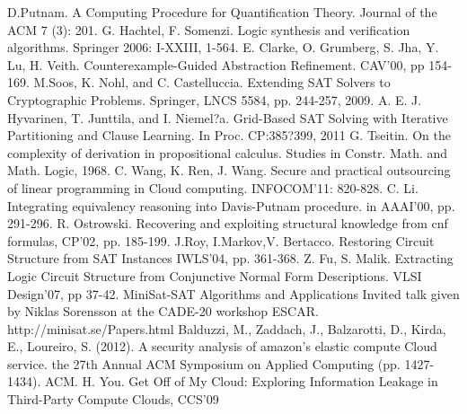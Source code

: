 \documentclass[conference]{IEEEtran}
\begin{document}
%
%
%
\begin{thebibliography}{26}

D.Putnam.
A Computing Procedure for Quantification Theory.
Journal of the ACM 7 (3): 201.
G. Hachtel, F. Somenzi.
Logic synthesis and verification algorithms. Springer 2006: I-XXIII, 1-564.
E. Clarke, O. Grumberg, S. Jha, Y. Lu, H. Veith.
Counterexample-Guided Abstraction Refinement.
CAV'00, pp 154-169.
M.Soos, K. Nohl, and C. Castelluccia. Extending SAT Solvers to Cryptographic Problems.
 Springer, LNCS 5584, pp. 244-257, 2009.
A. E. J. Hyvarinen, T. Junttila, and I. Niemel?a.
Grid-Based SAT Solving with Iterative Partitioning and Clause Learning. In Proc. CP:385?399, 2011
G. Tseitin.
On the complexity of derivation in propositional calculus. Studies in Constr. Math. and Math. Logic, 1968.
C. Wang, K. Ren, J. Wang.
Secure and practical outsourcing of linear programming in Cloud computing. INFOCOM'11: 820-828.
C. Li.
Integrating equivalency reasoning into Davis-Putnam procedure. in AAAI'00, pp. 291-296.
R. Ostrowski.
Recovering and exploiting structural knowledge from cnf formulas, CP'02, pp. 185-199.
J.Roy, I.Markov,V. Bertacco.
Restoring Circuit Structure from SAT Instances IWLS'04, pp. 361-368.
Z. Fu, S. Malik.
Extracting Logic Circuit Structure from Conjunctive Normal Form Descriptions.
VLSI Design'07, pp 37-42.
MiniSat-SAT Algorithms and Applications Invited talk given by Niklas Sorensson at the CADE-20 workshop ESCAR.
http://minisat.se/Papers.html
Balduzzi, M., Zaddach, J., Balzarotti, D., Kirda, E., Loureiro, S. (2012).
A security analysis of amazon's elastic compute Cloud service. the 27th Annual ACM Symposium on Applied Computing (pp. 1427-1434). ACM.
H. You.
Get Off of My Cloud: Exploring Information Leakage in Third-Party Compute Clouds, CCS'09

\end{thebibliography}
\end{document}
